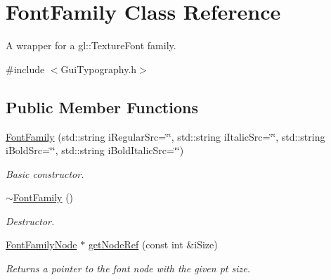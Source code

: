 \hypertarget{class_font_family}{\section{Font\-Family Class Reference}
\label{class_font_family}
}


A wrapper for a gl\-::\-Texture\-Font family.  




{\ttfamily \#include $<$Gui\-Typography.\-h$>$}

\subsection*{Public Member Functions}
\begin{DoxyCompactItemize}
\item 
\hypertarget{class_font_family_a30efff7a13bf83c6af5cf0164cc24d3d}{\hyperlink{class_font_family_a30efff7a13bf83c6af5cf0164cc24d3d}{Font\-Family} (std\-::string i\-Regular\-Src=\char`\"{}\char`\"{}, std\-::string i\-Italic\-Src=\char`\"{}\char`\"{}, std\-::string i\-Bold\-Src=\char`\"{}\char`\"{}, std\-::string i\-Bold\-Italic\-Src=\char`\"{}\char`\"{})}\label{class_font_family_a30efff7a13bf83c6af5cf0164cc24d3d}

\begin{DoxyCompactList}\small\item\em Basic constructor. \end{DoxyCompactList}\item 
\hypertarget{class_font_family_a26f8c17b1f5269307d39e3ded6f4510e}{\hyperlink{class_font_family_a26f8c17b1f5269307d39e3ded6f4510e}{$\sim$\-Font\-Family} ()}\label{class_font_family_a26f8c17b1f5269307d39e3ded6f4510e}

\begin{DoxyCompactList}\small\item\em Destructor. \end{DoxyCompactList}\item 
\hypertarget{class_font_family_ae139d3837d378ad68c56b6f8a72ee1b8}{\hyperlink{class_font_family_node}{Font\-Family\-Node} $\ast$ \hyperlink{class_font_family_ae139d3837d378ad68c56b6f8a72ee1b8}{get\-Node\-Ref} (const int \&i\-Size)}\label{class_font_family_ae139d3837d378ad68c56b6f8a72ee1b8}

\begin{DoxyCompactList}\small\item\em Returns a pointer to the font node with the given pt size. \end{DoxyCompactList}\end{DoxyCompactItemize}


